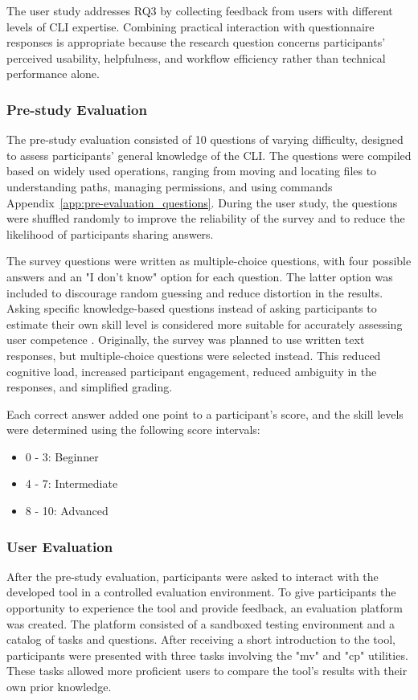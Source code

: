 The user study addresses RQ3 by collecting feedback from users with different levels of CLI expertise. Combining practical interaction with questionnaire responses is appropriate because the research question concerns participants’ perceived usability, helpfulness, and workflow efficiency rather than technical performance alone.

\subsubsection{Pre-study Evaluation}
The pre-study evaluation consisted of 10 questions of varying difficulty, designed to assess participants' general knowledge of the CLI. The questions were compiled based on widely used operations, ranging from moving and locating files to understanding paths, managing permissions, and using commands Appendix~\ref{app:pre-evaluation_questions}. During the user study, the questions were shuffled randomly to improve the reliability of the survey and to reduce the likelihood of participants sharing answers.

The survey questions were written as multiple-choice questions, with four possible answers and an "I don't know" option for each question. The latter option was included to discourage random guessing and reduce distortion in the results. Asking specific knowledge-based questions instead of asking participants to estimate their own skill level is considered more suitable for accurately assessing user competence \cite{kruger1999unskilled}. Originally, the survey was planned to use written text responses, but multiple-choice questions were selected instead. This reduced cognitive load, increased participant engagement, reduced ambiguity in the responses, and simplified grading.

Each correct answer added one point to a participant's score, and the skill levels were determined using the following score intervals:
\begin{itemize}
	\item 0 - 3: Beginner
	\item 4 - 7: Intermediate
	\item 8 - 10: Advanced
\end{itemize}

\subsubsection{User Evaluation}

After the pre-study evaluation, participants were asked to interact with the developed tool in a controlled evaluation environment. To give participants the opportunity to experience the tool and provide feedback, an evaluation platform was created. The platform consisted of a sandboxed testing environment and a catalog of tasks and questions. After receiving a short introduction to the tool, participants were presented with three tasks involving the "mv" and "cp" utilities. These tasks allowed more proficient users to compare the tool's results with their own prior knowledge.

